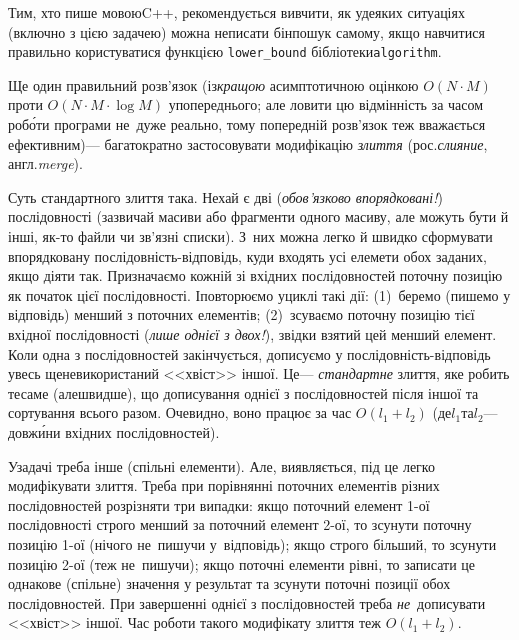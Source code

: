 Тим, хто пише мовою\nolinebreak[3] C++, рекомендується вивчити, як у\nolinebreak[3] деяких ситуаціях (включно з цією задачею) можна не\nolinebreak[3] писати бін\-пошук самому, якщо навчитися правильно користуватися функцією \verb"lower_bound" бібліотеки\nolinebreak[2] \texttt{algorithm}.


Ще один правильний розв'язок (із\nolinebreak[2] \emph{кращою} асимптотичною оцінкою $O(N{\cdot}M)$ проти $O(N{\cdot}M{\cdot}\log{}M)$ у\nolinebreak[3] попереднього; але ловити цю відмінність за часом роб\'{о}ти програми не~дуже реально, тому попередній розв'язок теж вважається ефективним)\nolinebreak[3] --- багатократно застосовувати модифікацію \emph{злиття} (рос.\nolinebreak[3] \emph{слияние}, англ.\nolinebreak[3] \emph{merge}). 

Суть стандартного злиття така. Нехай є дві (\emph{обов'язково впорядковані!}) послідовності (зазвичай масиви або фрагменти одного масиву, але можуть бути й інші, як-то файли чи зв'язні списки). З~них можна легко й швидко сформувати впорядковану послі\-дов\-ність-від\-повідь, куди входять усі елемети обох заданих, якщо діяти так. Призначаємо кожній зі вхідних послідовностей поточну позицію як початок цієї послідовності. І\nolinebreak[3] повторюємо у\nolinebreak[3] циклі такі дії: (1)~беремо (пишемо у відповідь) менший з поточних елементів; (2)~зсуваємо поточну позицію тієї вхідної послідовності (\emph{лише однієї з двох!}), звідки взятий цей менший елемент. Коли одна з послідовностей закінчується, дописуємо у послі\-дов\-ність-від\-по\-відь увесь ще\nolinebreak[3] не\nolinebreak[3] використаний <<хвіст>> іншої. Це\nolinebreak[3] --- \emph{стандартне} злиття, яке робить те\nolinebreak[3] саме (але\nolinebreak[3] швидше), що дописування однієї з послідовностей після іншої та сортування всього разом. Очевидно, воно працює за час $O(l_1{+}l_2)$ (де\nolinebreak[3] $l_1$\nolinebreak[1] та\nolinebreak[3] $l_2$\nolinebreak[3] --- довж\'{и}ни вхідних послідовностей).

У\nolinebreak[3] задачі треба інше (спільні елементи). Але, виявляється, під це легко модифікувати злиття. Треба при порівнянні поточних елементів різних послідовностей розрізняти три випадки: якщо поточний елемент \mbox{1-ої} послідовності строго менший за поточний елемент \mbox{2-ої}, то зсунути поточну позицію \mbox{1-ої} (нічого не~пишучи у~відповідь); якщо строго більший, то зсунути позицію \mbox{2-ої} (теж не~пишучи); якщо поточні елементи рівні, то записати це однакове (спільне) значення у результат та зсунути поточні позиції обох послідовностей. При завершенні однієї з послідовностей треба \emph{не}~дописувати <<хвіст>> іншої. Час роботи такого модифікату злиття теж $O(l_1{+}l_2)$.

